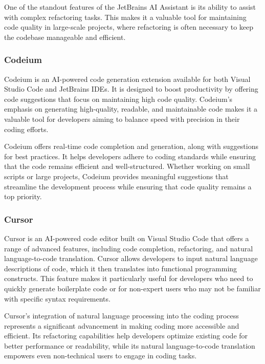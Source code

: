 One of the standout features of the JetBrains AI Assistant is its ability to assist with complex refactoring tasks. This makes it a valuable tool for maintaining code quality in large-scale projects, where refactoring is often necessary to keep the codebase manageable and efficient.

\subsubsection{Codeium}

Codeium \cite{Codeium} is an AI-powered code generation extension available for both Visual Studio Code and JetBrains IDEs. It is designed to boost productivity by offering code suggestions that focus on maintaining high code quality. Codeium's emphasis on generating high-quality, readable, and maintainable code makes it a valuable tool for developers aiming to balance speed with precision in their coding efforts.

Codeium offers real-time code completion and generation, along with suggestions for best practices. It helps developers adhere to coding standards while ensuring that the code remains efficient and well-structured. Whether working on small scripts or large projects, Codeium provides meaningful suggestions that streamline the development process while ensuring that code quality remains a top priority.

\subsubsection{Cursor}

Cursor is an AI-powered code editor built on Visual Studio Code that offers a range of advanced features, including code completion, refactoring, and natural language-to-code translation. Cursor allows developers to input natural language descriptions of code, which it then translates into functional programming constructs. This feature makes it particularly useful for developers who need to quickly generate boilerplate code or for non-expert users who may not be familiar with specific syntax requirements.

Cursor's integration of natural language processing into the coding process represents a significant advancement in making coding more accessible and efficient. Its refactoring capabilities help developers optimize existing code for better performance or readability, while its natural language-to-code translation empowers even non-technical users to engage in coding tasks.

